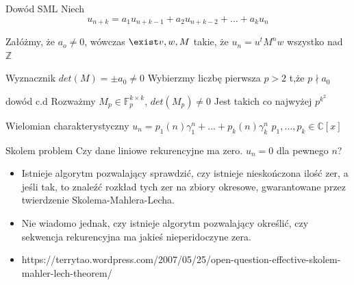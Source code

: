 \documentclass{beamer}
\theoremstyle{definition}
\begin{document}
\begin{frame}{Dowód  SML}
    Niech $$u_{n+k}=a_{1} u_{n+k-1}+a_{2} u_{n+k-2}+\ldots+a_{k} u_{n}$$

    Załóżmy, że $a_o \neq 0$, wówczas $\exist v, w, M$ takie, że 
    $u_n = u^{t} M^{n} w $ wszystko nad $\mathbb{Z}$

    Wyznacznik $det(M) = \pm a_0 \neq 0$
    Wybierzmy liczbę pierwsza $p > 2$ t,że $p \nmid a_0$
\end{frame}

\begin{frame}{dowód c.d}
    Rozważmy $M_p \in \mathbb{F}_p^{k\times k} $, $det(M_p) \neq 0$
    Jest takich co najwyżej $p^{k^{2}}$
\end{frame}


\begin{frame}{Wielomian charakterystyczny}
    $u_{n}=p_{1}(n) \gamma_{1}^{n}+\ldots+p_{k}(n) \gamma_{k}^{n}$
    $p_{1}, \ldots, p_{k} \in \mathbb{C}[x]$
\end{frame}



\begin{frame}{Skolem problem}
    Czy dane liniowe rekurencyjne ma zero. 
    $u_n = 0$ dla pewnego $n$?
    \begin{itemize}
        \item Istnieje algorytm pozwalający sprawdzić, czy istnieje nieskończona ilość zer, a jeśli tak, to znaleźć rozkład tych zer na zbiory okresowe, gwarantowane przez twierdzenie Skolema-Mahlera-Lecha. 
        \item Nie wiadomo jednak, czy istnieje algorytm pozwalający określić, czy sekwencja rekurencyjna ma jakieś nieperidoczyne zera. 
    \end{itemize}
\end{frame}


\begin{frame}


\begin{itemize}
    \item https://terrytao.wordpress.com/2007/05/25/open-question-effective-skolem-mahler-lech-theorem/
\end{itemize}
\end{frame}
\end{document}

